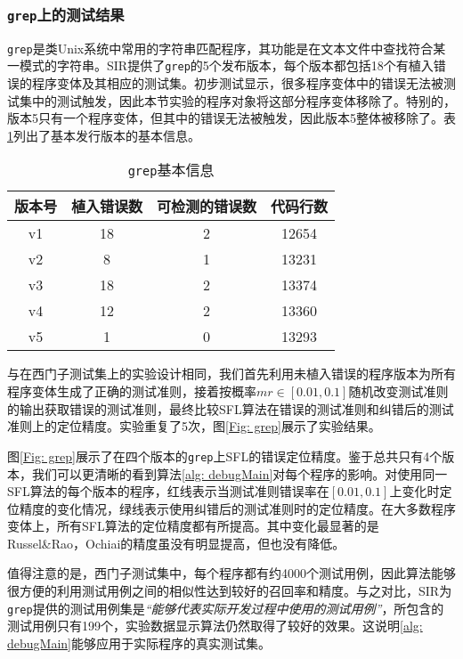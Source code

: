 \subsubsection{\texttt{grep}上的测试结果}

\texttt{grep}是类Unix系统中常用的字符串匹配程序，其功能是在文本文件中查找符合某一模式的字符串。SIR\cite{doESE05}提供了\texttt{grep}的5个发布版本，每个版本都包括18个有植入错误的程序变体及其相应的测试集。初步测试显示，很多程序变体中的错误无法被测试集中的测试触发，因此本节实验的程序对象将这部分程序变体移除了。特别的，版本5只有一个程序变体，但其中的错误无法被触发，因此版本5整体被移除了。表\ref{Tab: grep-info}列出了基本发行版本的基本信息。

\begin{table}
	\caption{\texttt{grep}基本信息} \label{Tab: grep-info}
	\centering
	\begin{tabular}{c|c|c|c}
		\hline 版本号 & 植入错误数 & 可检测的错误数 & 代码行数 \\ 
		\hline v1 & 18 & 2 & 12654 \\ 
		\hline v2 & 8 & 1 & 13231 \\ 
		\hline v3 & 18 & 2 & 13374 \\ 
		\hline v4 & 12 & 2 & 13360 \\ 
		\hline v5 & 1 & 0 & 13293 \\ 
		\hline
	\end{tabular} 
\end{table}

与在西门子测试集上的实验设计相同，我们首先利用未植入错误的程序版本为所有程序变体生成了正确的测试准则，接着按概率$mr\in [0.01, 0.1]$随机改变测试准则的输出获取错误的测试准则，最终比较SFL算法在错误的测试准则和纠错后的测试准则上的定位精度。实验重复了5次，图\ref{Fig: grep}展示了实验结果。


图\ref{Fig: grep}展示了在四个版本的\texttt{grep}上SFL的错误定位精度。鉴于总共只有4个版本，我们可以更清晰的看到算法\ref{alg: debugMain}对每个程序的影响。对使用同一SFL算法的每个版本的程序，红线表示当测试准则错误率在$[0.01,0.1]$上变化时定位精度的变化情况，绿线表示使用纠错后的测试准则时的定位精度。在大多数程序变体上，所有SFL算法的定位精度都有所提高。其中变化最显著的是Russel\&Rao，Ochiai的精度虽没有明显提高，但也没有降低。

值得注意的是，西门子测试集中，每个程序都有约4000个测试用例，因此算法能够很方便的利用测试用例之间的相似性达到较好的召回率和精度。与之对比，SIR为\texttt{grep}提供的测试用例集是\textit{“能够代表实际开发过程中使用的测试用例”}\cite{doESE05}，所包含的测试用例只有199个，实验数据显示算法仍然取得了较好的效果。这说明\ref{alg: debugMain}能够应用于实际程序的真实测试集。

